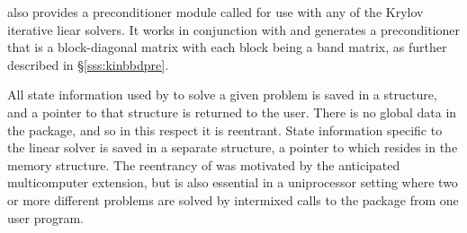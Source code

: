 {\kinsol} also provides a preconditioner module called {\kinbbdpre} for use
with any of the Krylov iterative liear solvers. It works in conjunction
with {\nvecp} and generates a preconditioner that is
a block-diagonal matrix with each block being a band matrix, as
further described in \S\ref{sss:kinbbdpre}.

All state information used by {\kinsol} to solve a given problem is saved
in a structure, and a pointer to that structure is returned to the
user.  There is no global data in the {\kinsol} package, and so in this
respect it is reentrant. State information specific to the linear
solver is saved in a separate structure, a pointer to which resides in
the {\kinsol} memory structure. The reentrancy of {\kinsol} was motivated
by the anticipated multicomputer extension, but is also essential
in a uniprocessor setting where two or more different problems are solved by
intermixed calls to the package from one user program.
